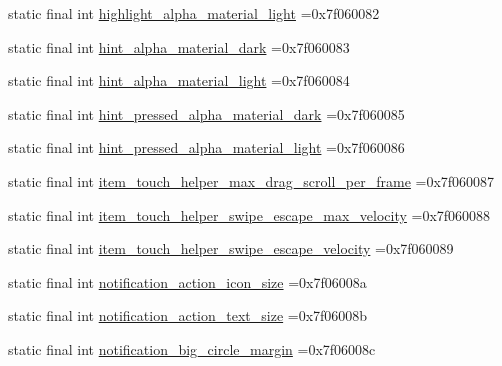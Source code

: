\begin{DoxyCompactItemize}
\item 
static final int \mbox{\hyperlink{classbr_1_1unb_1_1cic_1_1mp_1_1marketmaster_1_1R_1_1dimen_a3a4175a3a9da9a207cf9d8f54d7a2207}{highlight\+\_\+alpha\+\_\+material\+\_\+light}} =0x7f060082
\item 
static final int \mbox{\hyperlink{classbr_1_1unb_1_1cic_1_1mp_1_1marketmaster_1_1R_1_1dimen_a46c815ba8cf45a4a0a46f24f0c9e9583}{hint\+\_\+alpha\+\_\+material\+\_\+dark}} =0x7f060083
\item 
static final int \mbox{\hyperlink{classbr_1_1unb_1_1cic_1_1mp_1_1marketmaster_1_1R_1_1dimen_aa2545a2f70c1aeacec1f121f3a86eb6c}{hint\+\_\+alpha\+\_\+material\+\_\+light}} =0x7f060084
\item 
static final int \mbox{\hyperlink{classbr_1_1unb_1_1cic_1_1mp_1_1marketmaster_1_1R_1_1dimen_a9a07105fe2f917f7bf4d784e075f6492}{hint\+\_\+pressed\+\_\+alpha\+\_\+material\+\_\+dark}} =0x7f060085
\item 
static final int \mbox{\hyperlink{classbr_1_1unb_1_1cic_1_1mp_1_1marketmaster_1_1R_1_1dimen_a2723716eb87949bd1307533c1a357e80}{hint\+\_\+pressed\+\_\+alpha\+\_\+material\+\_\+light}} =0x7f060086
\item 
static final int \mbox{\hyperlink{classbr_1_1unb_1_1cic_1_1mp_1_1marketmaster_1_1R_1_1dimen_a949c2c360358f4266065fd2484526331}{item\+\_\+touch\+\_\+helper\+\_\+max\+\_\+drag\+\_\+scroll\+\_\+per\+\_\+frame}} =0x7f060087
\item 
static final int \mbox{\hyperlink{classbr_1_1unb_1_1cic_1_1mp_1_1marketmaster_1_1R_1_1dimen_a386a81263a691eb09dbf1459cc3a82ba}{item\+\_\+touch\+\_\+helper\+\_\+swipe\+\_\+escape\+\_\+max\+\_\+velocity}} =0x7f060088
\item 
static final int \mbox{\hyperlink{classbr_1_1unb_1_1cic_1_1mp_1_1marketmaster_1_1R_1_1dimen_a3a0fc69b57086ee98a66aa86d6374014}{item\+\_\+touch\+\_\+helper\+\_\+swipe\+\_\+escape\+\_\+velocity}} =0x7f060089
\item 
static final int \mbox{\hyperlink{classbr_1_1unb_1_1cic_1_1mp_1_1marketmaster_1_1R_1_1dimen_a3c434ed69639bb8c78e7de566418a4a8}{notification\+\_\+action\+\_\+icon\+\_\+size}} =0x7f06008a
\item 
static final int \mbox{\hyperlink{classbr_1_1unb_1_1cic_1_1mp_1_1marketmaster_1_1R_1_1dimen_a932d99467798499d92970d9812117ba3}{notification\+\_\+action\+\_\+text\+\_\+size}} =0x7f06008b
\item 
static final int \mbox{\hyperlink{classbr_1_1unb_1_1cic_1_1mp_1_1marketmaster_1_1R_1_1dimen_ab194732e969e5a0821a3b7f70699ad98}{notification\+\_\+big\+\_\+circle\+\_\+margin}} =0x7f06008c

\end{DoxyCompactItemize}
